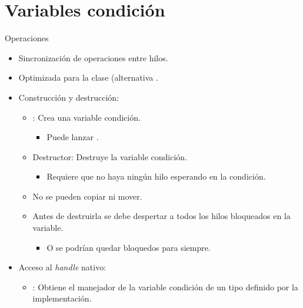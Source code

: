 \section{Variables condición}

\begin{frame}{Operaciones}
\begin{itemize}
  \item Sincronización de operaciones entre hilos.
  \item Optimizada para la clase  (alternativa .
  \item Construcción y destrucción:
    \begin{itemize}
      \item {}: Crea una variable condición.
        \begin{itemize}
          \item Puede lanzar .
        \end{itemize}
      \item Destructor: Destruye la variable condición.
        \begin{itemize}
          \item Requiere que no haya ningún hilo esperando en la condición.
        \end{itemize}
      \item No se pueden copiar ni mover.
      \item Antes de destruirla se debe despertar a todos los hilos bloqueados en la variable.
        \begin{itemize}
          \item O se podrían quedar bloquedos para siempre.
        \end{itemize}
    \end{itemize}
  \item Acceso al \emph{handle} nativo:
    \begin{itemize}
      \item {}: Obtiene el manejador de la variable condición
            de un tipo  definido por la implementación.
    \end{itemize}
\end{itemize}
\end{frame}


